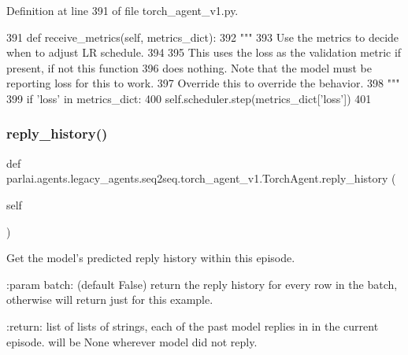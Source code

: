 Definition at line 391 of file torch\+\_\+agent\+\_\+v1.\+py.


\begin{DoxyCode}
391     \textcolor{keyword}{def }receive\_metrics(self, metrics\_dict):
392         \textcolor{stringliteral}{"""}
393 \textcolor{stringliteral}{        Use the metrics to decide when to adjust LR schedule.}
394 \textcolor{stringliteral}{}
395 \textcolor{stringliteral}{        This uses the loss as the validation metric if present, if not this function}
396 \textcolor{stringliteral}{        does nothing. Note that the model must be reporting loss for this to work.}
397 \textcolor{stringliteral}{        Override this to override the behavior.}
398 \textcolor{stringliteral}{        """}
399         \textcolor{keywordflow}{if} \textcolor{stringliteral}{'loss'} \textcolor{keywordflow}{in} metrics\_dict:
400             self.scheduler.step(metrics\_dict[\textcolor{stringliteral}{'loss'}])
401 
\end{DoxyCode}
\mbox{\label{classparlai_1_1agents_1_1legacy__agents_1_1seq2seq_1_1torch__agent__v1_1_1TorchAgent_ae4b2346c35e214a8028eb83d1fc5ffd7}} 
\subsubsection{\texorpdfstring{reply\+\_\+history()}{reply\_history()}}
{\footnotesize\ttfamily def parlai.\+agents.\+legacy\+\_\+agents.\+seq2seq.\+torch\+\_\+agent\+\_\+v1.\+Torch\+Agent.\+reply\+\_\+history (\begin{DoxyParamCaption}\item[{}]{self }\end{DoxyParamCaption})}

\begin{DoxyVerb}Get the model's predicted reply history within this episode.

:param batch: (default False) return the reply history for every
      row in the batch, otherwise will return just for this
      example.

:return: list of lists of strings, each of the past model replies in
 in the current episode. will be None wherever model did not
 reply.
\end{DoxyVerb}
 

